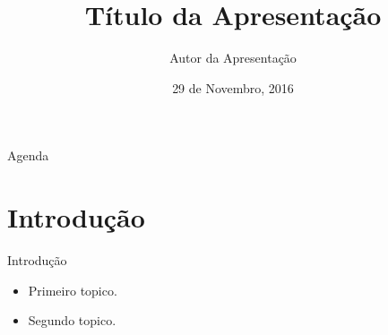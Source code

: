 \documentclass{beamer}
\title{Título da Apresentação}
\author{Autor da Apresentação}
\date{29 de Novembro, 2016}
\institute
{
  Universidade Federal do Rio de Janeiro\\
  UFRJ/COPPE/PEE
}
\begin{document}
{
\begin{frame}
  \bigskip\bigskip\bigskip\bigskip
  \titlepage
\end{frame}
}

\begin{frame}{Agenda}
  \tableofcontents
\end{frame}

\section{Introdução}

\begin{frame}{Introdução}
  \begin{itemize}
  \item {
    Primeiro topico.
    \pause
  }
  \item {
    Segundo topico.
  }
  \end{itemize}
\end{frame}
\end{document}
